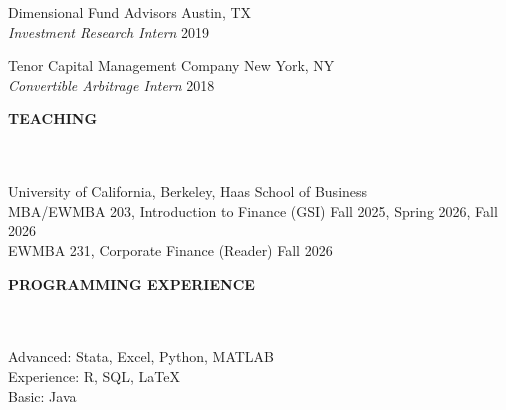 \documentclass[a4paper]{article}
\newcommand{\lineunder} {
    \vspace*{-8pt} \\
    \hspace*{-18pt} \hrulefill \\
}
\newcommand{\header} [1] {
    {\hspace*{-18pt}\vspace*{1pt} \textbf{\MakeUppercase{#1}}}
    \lineunder
}
\begin{document}
Dimensional Fund Advisors \hfill  Austin, TX\\
\textit{Investment Research Intern} \hfill 2019\\
\vspace{3mm}

Tenor Capital Management Company \hfill  New York, NY\\
\textit{Convertible Arbitrage Intern} \hfill 2018\\
\vspace{5mm}

\header{Teaching}
\vspace{1mm}
University of California, Berkeley, Haas School of Business \\
MBA/EWMBA 203, Introduction to Finance (GSI) \hfill Fall 2025, Spring 2026, Fall 2026\\
EWMBA 231, Corporate Finance (Reader) \hfill Fall 2026\\
\vspace{5mm}

\header{Programming Experience}
\vspace{1mm}
	Advanced: Stata, Excel, Python, MATLAB \\
	Experience: R, SQL, LaTeX \\
	Basic: Java \\
\vspace{5mm}
\end{document}
